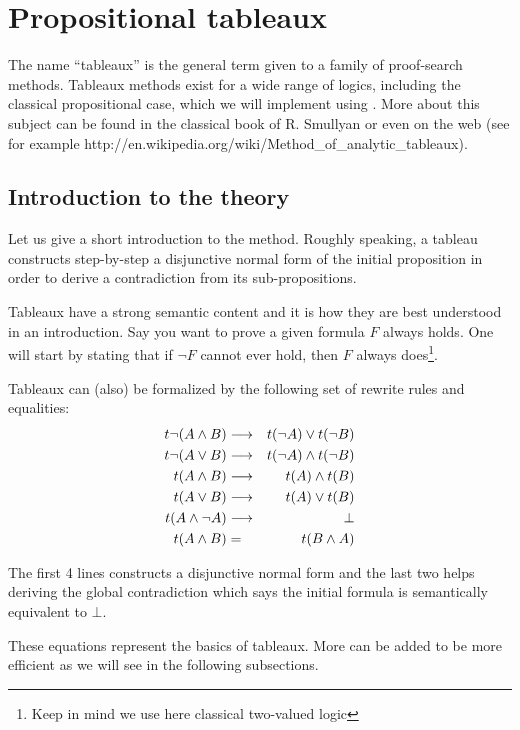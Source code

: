 \section{Propositional tableaux}
\label{sec:proptab}

The name ``tableaux'' is the general term given to a 
family of proof-search methods. Tableaux methods exist for a wide
range of logics, including the classical propositional case, which we
will implement using \moca. More about this subject can be found in
the classical book \cite{Smu68} of R. Smullyan or even on the web (see
for example {\sf
  http://en.wikipedia.org/wiki/Method\_of\_analytic\_tableaux}). 

\subsection{Introduction to the theory}

Let us give a short introduction to the method. Roughly speaking,
a tableau  constructs step-by-step a disjunctive normal form of the initial
proposition in order to derive a contradiction from its
sub-propositions. 

Tableaux have a strong semantic content and it is how they are best
understood in an introduction. Say you want to prove a given formula
$F$ always holds. One will start by stating that if $\neg F$ cannot
ever hold, then $F$ always does\footnote{Keep in mind we use here
  classical two-valued logic}. 

Tableaux can (also) be formalized by the following set of rewrite rules and
equalities:
\begin{eqnarray*}
  t \neg (A\land B) &\longrightarrow & t(\neg A) \vee t(\neg B) \\
  t \neg (A\vee B) &\longrightarrow & t(\neg A) \land t(\neg B) \\
  t (A\land B) &\longrightarrow & t(A) \land t(B) \\
  t (A\vee B) &\longrightarrow & t(A) \vee t(B) \\
  t (A \land \neg A) & \longrightarrow & \bot \\
  t (A\land B) & = & t (B\land A)
\end{eqnarray*}

The first 4 lines constructs a disjunctive normal form and the last
two helps deriving the global contradiction which says the initial
formula is semantically equivalent to $\bot$.

These equations represent the basics of tableaux. More can be added to
be more efficient as we will see in the following subsections.

